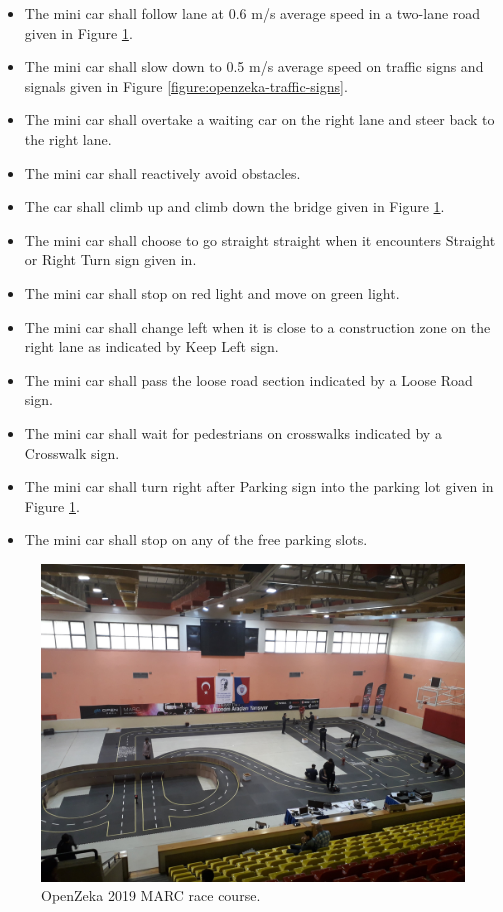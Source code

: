 \begin{itemize}
  \item The mini car shall follow lane at 0.6 m/s average speed in a two-lane
    road given in Figure \ref{figure:openzeka-race-course}.
  \item The mini car shall slow down to 0.5 m/s average speed on traffic signs
    and signals given in Figure \ref{figure:openzeka-traffic-signs}.
  \item The mini car shall overtake a waiting car on the right lane and steer
    back to the right lane.
  \item The mini car shall reactively avoid obstacles.
  \item The car shall climb up and climb down the bridge given in Figure
    \ref{figure:openzeka-race-course}.
  \item The mini car shall choose to go straight straight when it encounters
    Straight or Right Turn sign given in.
  \item The mini car shall stop on red light and move on green light.
  \item The mini car shall change left when it is close to a construction zone
    on the right lane as indicated by Keep Left sign.
  \item The mini car shall pass the loose road section indicated by a Loose
    Road sign.
  \item The mini car shall wait for pedestrians on crosswalks indicated by a
    Crosswalk sign.
  \item The mini car shall turn right after Parking sign into the parking lot
    given in Figure \ref{figure:openzeka-race-course}.
  \item The mini car shall stop on any of the free parking slots.
\end{itemize}

\begin{figure}[h]
  \centering
  \includegraphics[width=.8\textwidth]{figures/openzeka-race-course.jpeg}
  \caption{OpenZeka 2019 MARC race course.}
  \label{figure:openzeka-race-course}
\end{figure}

